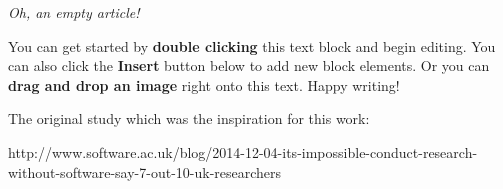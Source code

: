 \textit{Oh, an empty article!} 

You can get started by \textbf{double clicking} this text block and begin editing. You can also click the \textbf{Insert} button below to add new block elements. Or you can \textbf{drag and drop an image} right onto this text. Happy writing!

The original study which was the inspiration for this work:

http://www.software.ac.uk/blog/2014-12-04-its-impossible-conduct-research-without-software-say-7-out-10-uk-researchers